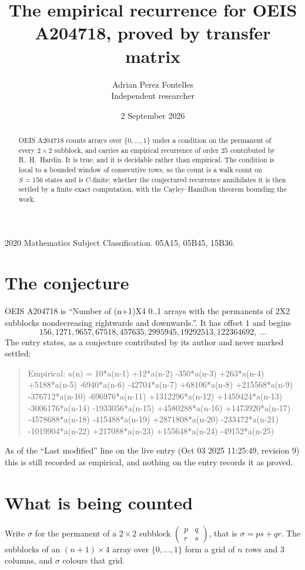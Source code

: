 \documentclass[11pt,a4paper]{article}
\title{The empirical recurrence for OEIS A204718, proved by transfer matrix}
\author{Adrian Perez Fontelles\\ \small Independent researcher}
\date{2 September 2026}
\theoremstyle{plain}
\theoremstyle{definition}
\begin{document}
\maketitle

\begin{abstract}
OEIS A204718 counts arrays over $\{0,\dots,1\}$ under a condition on the permanent of every
$2\times2$ subblock, and carries an empirical recurrence of order $25$ contributed by
R.~H.~Hardin. It is true, and it is decidable rather than empirical. The condition is local to
a bounded window of consecutive rows, so the count is a walk count on $S=156$ states and is
$C$-finite; whether the conjectured recurrence annihilates it is then settled by a finite exact
computation, with the Cayley--Hamilton theorem bounding the work.
\end{abstract}

\noindent\small 2020 Mathematics Subject Classification. 05A15, 05B45, 15B36.\normalsize

\section{The conjecture}

OEIS A204718 is ``Number of (n+1)X4 0..1 arrays with the permanents of 2X2 subblocks nondecreasing rightwards and downwards.''. It has offset $1$ and begins
\[
156, 1271, 9657, 67518, 457635, 2995945, 19292513, 122364692,\ \dots
\]
The entry states, as a conjecture contributed by its author and never marked settled:
\begin{quote}
Empirical: a(n) = 10*a(n-1) +12*a(n-2) -350*a(n-3) +263*a(n-4) +5188*a(n-5) -6940*a(n-6) -42704*a(n-7) +68106*a(n-8) +215568*a(n-9) -376712*a(n-10) -696976*a(n-11) +1312296*a(n-12) +1459424*a(n-13) -3006176*a(n-14) -1933056*a(n-15) +4580288*a(n-16) +1473920*a(n-17) -4578688*a(n-18) -415488*a(n-19) +2871808*a(n-20) -233472*a(n-21) -1019904*a(n-22) +217088*a(n-23) +155648*a(n-24) -49152*a(n-25)
\end{quote}
As of the ``Last modified'' line on the live entry (Oct 03 2025 11:25:49, revision 9) this is still
recorded as empirical, and nothing on the entry records it as proved.

\section{What is being counted}

Write $\sigma$ for the permanent of a $2\times2$ subblock
$\begin{pmatrix}p&q\\r&s\end{pmatrix}$, that is $\sigma=ps+qr$. The subblocks of an
$(n+1)\times4$ array over $\{0,\dots,1\}$ form a grid of $n$ rows and $3$
columns, and $\sigma$ colours that grid.
\end{document}
